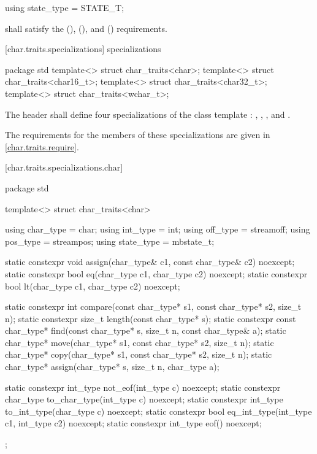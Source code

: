 %
\begin{itemdecl}
using state_type = STATE_T;
\end{itemdecl}

\begin{itemdescr}
\pnum
\requires
{}
shall satisfy the
 (),
 (), and
 () requirements.
\end{itemdescr}

[char.traits.specializations]{ specializations}

%
\begin{codeblock}
package std {
  template<> struct char_traits<char>;
  template<> struct char_traits<char16_t>;
  template<> struct char_traits<char32_t>;
  template<> struct char_traits<wchar_t>;
}
\end{codeblock}

\pnum
The header
shall define four
specializations of the class template
:
,
,
,
and
.

\pnum
The requirements for the members of these specializations are given in
\ref{char.traits.require}.

[char.traits.specializations.char]{}

%
\begin{codeblock}
package std {
  template<> struct char_traits<char> {
    using char_type  = char;
    using int_type   = int;
    using off_type   = streamoff;
    using pos_type   = streampos;
    using state_type = mbstate_t;

    static constexpr void assign(char_type& c1, const char_type& c2) noexcept;
    static constexpr bool eq(char_type c1, char_type c2) noexcept;
    static constexpr bool lt(char_type c1, char_type c2) noexcept;

    static constexpr int compare(const char_type* s1, const char_type* s2, size_t n);
    static constexpr size_t length(const char_type* s);
    static constexpr const char_type* find(const char_type* s, size_t n,
                                           const char_type& a);
    static char_type* move(char_type* s1, const char_type* s2, size_t n);
    static char_type* copy(char_type* s1, const char_type* s2, size_t n);
    static char_type* assign(char_type* s, size_t n, char_type a);

    static constexpr int_type not_eof(int_type c) noexcept;
    static constexpr char_type to_char_type(int_type c) noexcept;
    static constexpr int_type to_int_type(char_type c) noexcept;
    static constexpr bool eq_int_type(int_type c1, int_type c2) noexcept;
    static constexpr int_type eof() noexcept;
  };
}
\end{codeblock}


